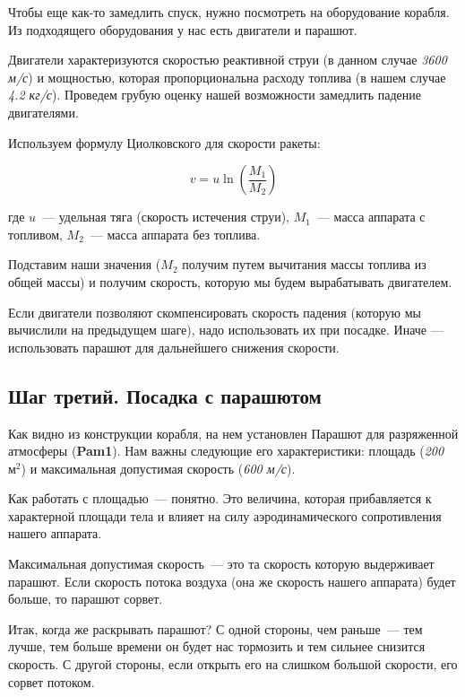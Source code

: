 \documentclass[12pt,a4paper]{article}
\begin{document}
Чтобы еще как-то замедлить спуск, нужно посмотреть на оборудование корабля. Из подходящего
оборудования у нас есть двигатели и парашют.

Двигатели характеризуются скоростью реактивной струи (в данном случае \emph{3600 м/с}) и
мощностью, которая пропорциональна расходу топлива (в нашем случае \emph{4.2 кг/с}). Проведем
грубую оценку нашей возможности замедлить падение двигателями.

Используем формулу Циолковского для скорости ракеты:

$$
v = u \ln\left(\frac{M_1}{M_2}\right)
$$

где $u$~--- удельная тяга (скорость истечения струи), $M_1$~--- масса аппарата с топливом,
$M_2$~--- масса аппарата без топлива.

Подставим наши значения ($M_2$ получим путем вычитания массы топлива из общей массы) и
получим скорость, которую мы будем вырабатывать двигателем.

\hfill

\noindent{}

\hfill

Если двигатели позволяют скомпенсировать скорость падения (которую мы вычислили на
предыдущем шаге), надо использовать их при посадке. Иначе — использовать парашют для
дальнейшего снижения скорости.

\subsection{Шаг третий. Посадка с парашютом}

Как видно из конструкции корабля, на нем установлен Парашют для разряженной атмосферы
(\textbf{Pam1}). Нам важны следующие его характеристики: площадь (\emph{200 $\text{м}^2$})
и максимальная допустимая скорость (\emph{600 м/с}).

Как работать с площадью~--- понятно. Это величина, которая прибавляется к характерной
площади тела и влияет на силу аэродинамического сопротивления нашего аппарата.

Максимальная допустимая скорость~--- это та скорость которую выдерживает парашют. Если
скорость потока воздуха (она же скорость нашего аппарата) будет больше, то парашют сорвет.

Итак, когда же раскрывать парашют? С одной стороны, чем раньше~--- тем лучше, тем больше
времени он будет нас тормозить и тем сильнее снизится скорость. С другой стороны, если
открыть его на слишком большой скорости, его сорвет потоком.
\end{document}
